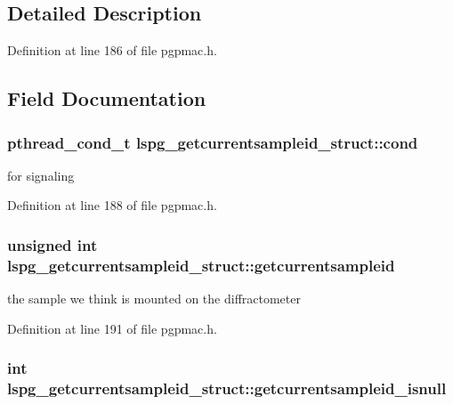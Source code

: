 \subsection{Detailed Description}


Definition at line 186 of file pgpmac.\-h.



\subsection{Field Documentation}
\hypertarget{structlspg__getcurrentsampleid__struct_a289960e45fdc9339a05dc8607f1b7563}{
\subsubsection[{cond}]{\setlength{\rightskip}{0pt plus 5cm}pthread\-\_\-cond\-\_\-t lspg\-\_\-getcurrentsampleid\-\_\-struct\-::cond}}\label{structlspg__getcurrentsampleid__struct_a289960e45fdc9339a05dc8607f1b7563}


for signaling 



Definition at line 188 of file pgpmac.\-h.

\hypertarget{structlspg__getcurrentsampleid__struct_af629de1e076fd6763bccea3547ef24e7}{
\subsubsection[{getcurrentsampleid}]{\setlength{\rightskip}{0pt plus 5cm}unsigned int lspg\-\_\-getcurrentsampleid\-\_\-struct\-::getcurrentsampleid}}\label{structlspg__getcurrentsampleid__struct_af629de1e076fd6763bccea3547ef24e7}


the sample we think is mounted on the diffractometer 



Definition at line 191 of file pgpmac.\-h.

\hypertarget{structlspg__getcurrentsampleid__struct_af370f8d1aaec7dd15121dc65d2a6cfc1}{
\subsubsection[{getcurrentsampleid\-\_\-isnull}]{\setlength{\rightskip}{0pt plus 5cm}int lspg\-\_\-getcurrentsampleid\-\_\-struct\-::getcurrentsampleid\-\_\-isnull}}\label{structlspg__getcurrentsampleid__struct_af370f8d1aaec7dd15121dc65d2a6cfc1}


